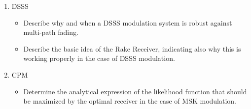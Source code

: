 \documentclass[11pt]{article}
\begin{document}
\begin{enumerate}
\item DSSS
\begin{itemize}
\item Describe why and when a DSSS modulation system is robust against multi-path fading.
\item Describe the basic idea of the Rake Receiver, indicating also why this is working properly in the case of DSSS modulation.
\end{itemize}
\item CPM
\begin{itemize}
\item Determine the analytical expression of the likelihood function that should be maximized by the optimal receiver in the case of MSK modulation.
\end{itemize}

\end{enumerate}



\end{document}
